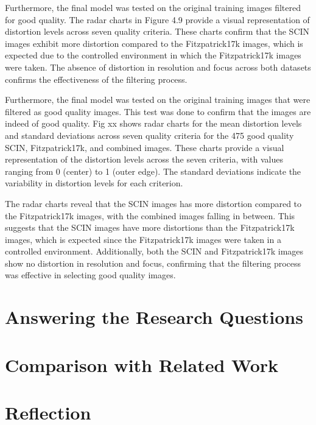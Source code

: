 \vspace{\baselineskip}
\noindent
Furthermore, the final model was tested on the original training images filtered for good quality. The radar charts in Figure 4.9 provide a visual representation of distortion levels across seven quality criteria. These charts confirm that the SCIN images exhibit more distortion compared to the Fitzpatrick17k images, which is expected due to the controlled environment in which the Fitzpatrick17k images were taken. The absence of distortion in resolution and focus across both datasets confirms the effectiveness of the filtering process. \par
\vspace{\baselineskip}
\noindent
Furthermore, the final model was tested on the original training images that were filtered as good quality images. This test was done to confirm that the images are indeed of good quality. Fig xx shows radar charts for the mean distortion levels and standard deviations across seven quality criteria for the 475 good quality SCIN, Fitzpatrick17k, and combined images. These charts provide a visual representation of the distortion levels across the seven criteria, with values ranging from 0 (center) to 1 (outer edge). The standard deviations indicate the variability in distortion levels for each criterion. \par
\vspace{\baselineskip}
\noindent
The radar charts reveal that the SCIN images has more distortion compared to the Fitzpatrick17k images, with the combined images falling in between. This suggests that the SCIN images have more distortions than the Fitzpatrick17k images, which is expected since the Fitzpatrick17k images were taken in a controlled environment. Additionally, both the SCIN and Fitzpatrick17k images show no distortion in resolution and focus, confirming that the filtering process was effective in selecting good quality images. \par
\section{Answering the Research Questions}
\label{sec:AnsweringResearchQuestions}

\section{Comparison with Related Work}
\label{sec:ComparisonRelatedWork}

\section{Reflection}
\label{sec:Reflection}

